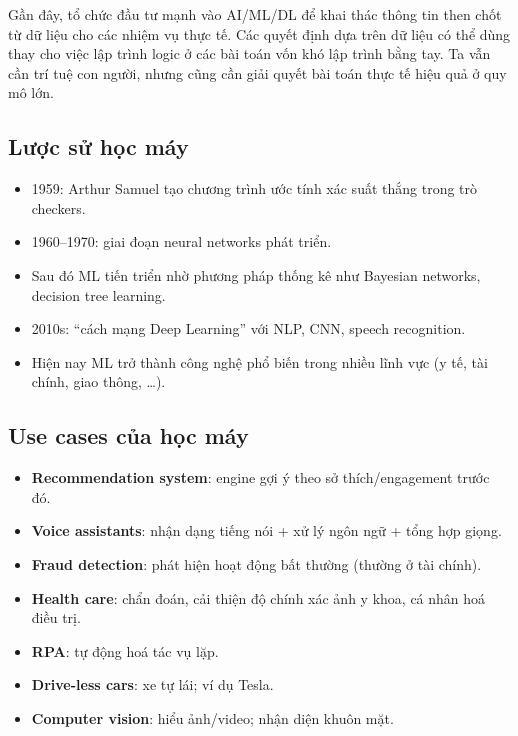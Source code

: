 \begin{ynghia}[title={Tự động hoá và quyết định dựa trên dữ liệu}]
Gần đây, tổ chức đầu tư mạnh vào AI/ML/DL để khai thác thông tin then chốt từ dữ liệu cho các nhiệm vụ thực tế.
Các quyết định dựa trên dữ liệu có thể dùng thay cho việc lập trình logic ở các bài toán vốn khó lập trình bằng tay.
Ta vẫn cần trí tuệ con người, nhưng cũng cần giải quyết bài toán thực tế hiệu quả ở quy mô lớn.
\end{ynghia}

\subsection{Lược sử học máy}

\begin{phuongphap}[title={Các mốc}]
\begin{itemize}
  \item 1959: Arthur Samuel tạo chương trình ước tính xác suất thắng trong trò checkers.
  \item 1960--1970: giai đoạn neural networks phát triển.
  \item Sau đó ML tiến triển nhờ phương pháp thống kê như Bayesian networks, decision tree learning.
  \item 2010s: “cách mạng Deep Learning” với NLP, CNN, speech recognition.
  \item Hiện nay ML trở thành công nghệ phổ biến trong nhiều lĩnh vực (y tế, tài chính, giao thông, \ldots).
\end{itemize}
\end{phuongphap}

\subsection{Use cases của học máy}

\begin{phuongphap}[title={Một số use case}]
\begin{itemize}
  \item \textbf{Recommendation system}: engine gợi ý theo sở thích/engagement trước đó.
  \item \textbf{Voice assistants}: nhận dạng tiếng nói + xử lý ngôn ngữ + tổng hợp giọng.
  \item \textbf{Fraud detection}: phát hiện hoạt động bất thường (thường ở tài chính).
  \item \textbf{Health care}: chẩn đoán, cải thiện độ chính xác ảnh y khoa, cá nhân hoá điều trị.
  \item \textbf{RPA}: tự động hoá tác vụ lặp.
  \item \textbf{Drive-less cars}: xe tự lái; ví dụ Tesla.
  \item \textbf{Computer vision}: hiểu ảnh/video; nhận diện khuôn mặt.
\end{itemize}
\end{phuongphap}

